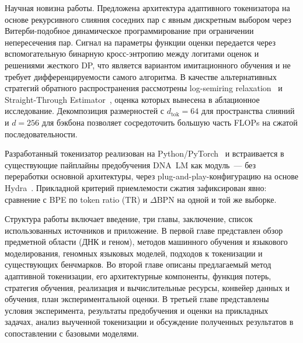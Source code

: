 Научная новизна работы. Предложена архитектура адаптивного
токенизатора на основе рекурсивного слияния соседних пар с явным
дискретным выбором через Витерби-подобное динамическое
программирование при ограничении непересечения пар. Сигнал на
параметры функции оценки передается через вспомогательную бинарную
кросс-энтропию между логитами оценок и решениями жесткого DP, что
является вариантом имитационного обучения и не требует
дифференцируемости самого алгоритма. В качестве альтернативных
стратегий обратного распространения рассмотрены log-semiring
relaxation~\cite{menschDifferentiableDynamicProgramming2018} и
Straight-Through
Estimator~\cite{bengioEstimatingPropagatingGradients2013}, оценка
которых вынесена в аблационное исследование. Декомпозиция
размерностей с $d_{\text{tok}} = 64$ для пространства слияний и
$d = 256$ для бэкбона позволяет сосредоточить большую часть FLOPs на
сжатой последовательности.

Разработанный токенизатор реализован на
Python/PyTorch~\cite{paszke2019pytorchimperativestylehighperformance}
и встраивается в существующие пайплайны предобучения DNA~LM как
модуль~--- без переработки основной архитектуры, через
plug-and-play-конфигурацию на основе
Hydra~\cite{yadanHydraConfigFramework2019}. Прикладной критерий
приемлемости сжатия зафиксирован явно: сравнение с BPE по token ratio
($\mathrm{TR}$) и $\Delta\mathrm{BPN}$ на одной и той же выборке.

Структура работы включает введение, три главы, заключение, список
использованных источников и приложение. В первой главе представлен
обзор предметной области (ДНК и геном), методов машинного обучения и
языкового моделирования, геномных языковых моделей, подходов к
токенизации и существующих бенчмарков. Во второй главе описаны
предлагаемый метод адаптивной токенизации, его архитектурные
компоненты, функция потерь, стратегия обучения, реализация и
вычислительные ресурсы, конвейер данных и обучения, план
экспериментальной оценки. В третьей главе представлены условия
эксперимента, результаты предобучения и оценки на прикладных
задачах, анализ выученной токенизации и обсуждение полученных
результатов в сопоставлении с базовыми моделями.
